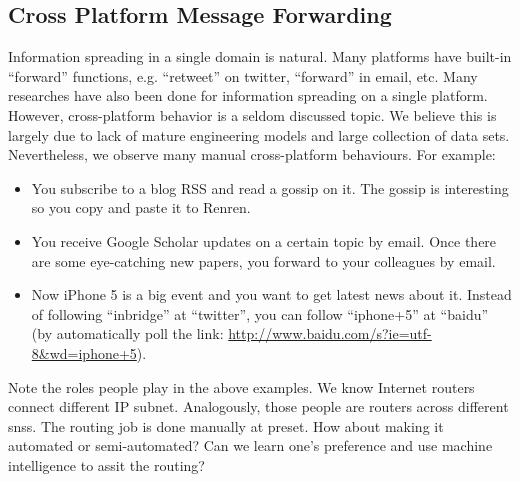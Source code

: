 \documentclass{sig-alternate}
\begin{document}
\subsection{Cross Platform Message Forwarding}
\label{sec:Cross Platform Message Forwarding}

Information spreading in a single domain is natural. 
Many platforms have built-in ``forward'' functions, 
e.g. ``retweet'' on twitter, ``forward'' in email, etc. 
Many researches have also been done for information spreading on a single platform. 
However, cross-platform behavior is a seldom discussed topic. 
We believe this is largely due to lack of mature engineering models
and large collection of data sets. 
Nevertheless, we observe many manual cross-platform behaviours.
For example:

\begin{itemize}
	\item 
	You subscribe to a blog RSS and read a gossip on it.
	The gossip is interesting so you copy and paste it to Renren. 
	\item 
	You receive Google Scholar updates on a certain topic by email.
	Once there are some eye-catching new papers, you forward to your colleagues by email.
	\item
	Now iPhone 5 is a big event and you want to get latest news about it.
	Instead of following ``inbridge'' at ``twitter'', you can follow ``iphone+5'' at ``baidu''
	(by automatically poll the link: \url{http://www.baidu.com/s?ie=utf-8&wd=iphone+5}). 
\end{itemize}

Note the roles people play in the above examples. 
We know Internet routers connect different IP subnet. 
Analogously, those people are routers across different \gls{sns}s. 
The routing job is done manually at preset. 
How about making it automated or semi-automated? 
Can we learn one's preference and use machine intelligence to assit the routing?  
\end{document}
